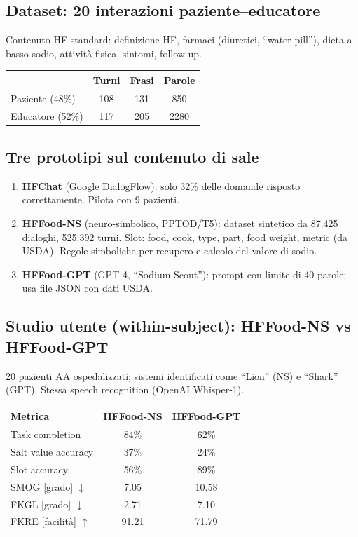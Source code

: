\documentclass[a4paper,12pt]{article}
\begin{document}
\subsection{Dataset: 20 interazioni paziente--educatore}
Contenuto HF standard: definizione HF, farmaci (diuretici, ``water pill''), dieta a basso sodio, attivit\`a fisica, sintomi, follow-up.

\begin{center}
\begin{tabular}{lccc}
\toprule
 & \textbf{Turni} & \textbf{Frasi} & \textbf{Parole} \\
\midrule
Paziente (48\%) & 108 & 131 & 850 \\
Educatore (52\%) & 117 & 205 & 2280 \\
\bottomrule
\end{tabular}
\end{center}

\subsection{Tre prototipi sul contenuto di sale}
\begin{enumerate}
    \item \textbf{HFChat} (Google DialogFlow): solo 32\% delle domande risposto correttamente. Pilota con 9 pazienti.
    \item \textbf{HFFood-NS} (neuro-simbolico, PPTOD/T5): dataset sintetico da 87.425 dialoghi, 525.392 turni. Slot: food, cook, type, part, food weight, metric (da USDA). Regole simboliche per recupero e calcolo del valore di sodio.
    \item \textbf{HFFood-GPT} (GPT-4, ``Sodium Scout''): prompt con limite di 40 parole; usa file JSON con dati USDA.
\end{enumerate}

\subsection{Studio utente (within-subject): HFFood-NS vs HFFood-GPT}
20 pazienti AA ospedalizzati; sistemi identificati come ``Lion'' (NS) e ``Shark'' (GPT). Stessa speech recognition (OpenAI Whisper-1).

\begin{center}
\begin{tabular}{lcc}
\toprule
\textbf{Metrica} & \textbf{HFFood-NS} & \textbf{HFFood-GPT} \\
\midrule
Task completion & 84\% & 62\% \\
Salt value accuracy & 37\% & 24\% \\
Slot accuracy & 56\% & 89\% \\
\midrule
SMOG [grado] $\downarrow$ & 7.05 & 10.58 \\
FKGL [grado] $\downarrow$ & 2.71 & 7.10 \\
FKRE [facilit\`a] $\uparrow$ & 91.21 & 71.79 \\
\bottomrule
\end{tabular}
\end{center}
\end{document}
